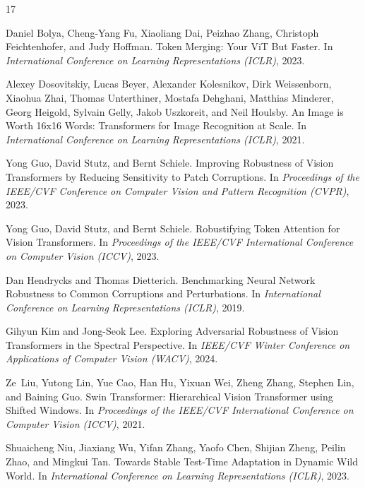 \documentclass{article}
\begin{document}

\begin{thebibliography}{17}

Daniel Bolya, Cheng-Yang Fu, Xiaoliang Dai, Peizhao Zhang, Christoph Feichtenhofer, and Judy Hoffman.
\newblock Token Merging: Your ViT But Faster.
\newblock In \emph{International Conference on Learning Representations (ICLR)}, 2023.

Alexey Dosovitskiy, Lucas Beyer, Alexander Kolesnikov, Dirk Weissenborn, Xiaohua Zhai, Thomas Unterthiner, Mostafa Dehghani, Matthias Minderer, Georg Heigold, Sylvain Gelly, Jakob Uszkoreit, and Neil Houlsby.
\newblock An Image is Worth 16x16 Words: Transformers for Image Recognition at Scale.
\newblock In \emph{International Conference on Learning Representations (ICLR)}, 2021.

Yong Guo, David Stutz, and Bernt Schiele.
\newblock Improving Robustness of Vision Transformers by Reducing Sensitivity to Patch Corruptions.
\newblock In \emph{Proceedings of the IEEE/CVF Conference on Computer Vision and Pattern Recognition (CVPR)}, 2023.

Yong Guo, David Stutz, and Bernt Schiele.
\newblock Robustifying Token Attention for Vision Transformers.
\newblock In \emph{Proceedings of the IEEE/CVF International Conference on Computer Vision (ICCV)}, 2023.

Dan Hendrycks and Thomas Dietterich.
\newblock Benchmarking Neural Network Robustness to Common Corruptions and Perturbations.
\newblock In \emph{International Conference on Learning Representations (ICLR)}, 2019.

Gihyun Kim and Jong-Seok Lee.
\newblock Exploring Adversarial Robustness of Vision Transformers in the Spectral Perspective.
\newblock In \emph{IEEE/CVF Winter Conference on Applications of Computer Vision (WACV)}, 2024.

Ze~Liu, Yutong Lin, Yue Cao, Han Hu, Yixuan Wei, Zheng Zhang, Stephen Lin, and Baining Guo.
\newblock Swin Transformer: Hierarchical Vision Transformer using Shifted Windows.
\newblock In \emph{Proceedings of the IEEE/CVF International Conference on Computer Vision (ICCV)}, 2021.

Shuaicheng Niu, Jiaxiang Wu, Yifan Zhang, Yaofo Chen, Shijian Zheng, Peilin Zhao, and Mingkui Tan.
\newblock Towards Stable Test-Time Adaptation in Dynamic Wild World.
\newblock In \emph{International Conference on Learning Representations (ICLR)}, 2023.


\end{thebibliography}
\end{document}
